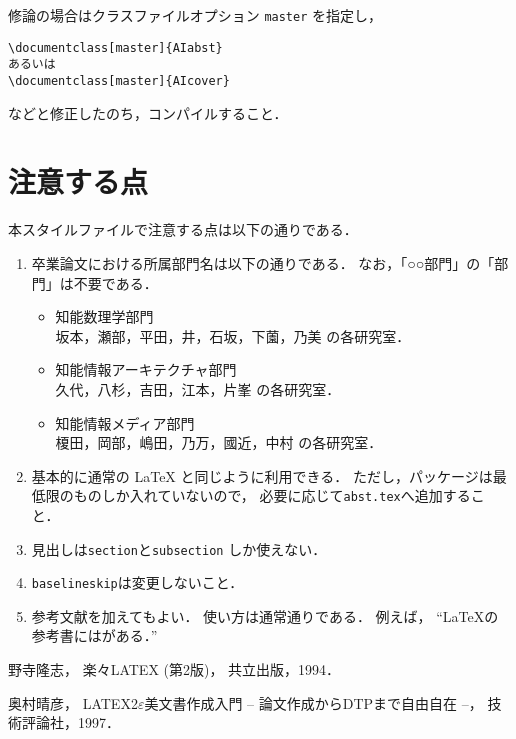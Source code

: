\documentclass[master]{AIabst} %
\begin{document}
修論の場合はクラスファイルオプション {\tt master} を指定し，
\begin{center}
\begin{verbatim}
\documentclass[master]{AIabst}
あるいは
\documentclass[master]{AIcover}
\end{verbatim}
\end{center}
などと修正したのち，コンパイルすること．


\section{注意する点}
本スタイルファイルで注意する点は以下の通りである．
\begin{enumerate}
\item
卒業論文における所属部門名は以下の通りである．
なお，「○○部門」の「部門」は不要である．
\begin{itemize}
\item 知能数理学部門\\
坂本，瀬部，平田，井，石坂，下薗，乃美 
の各研究室．
\item 知能情報アーキテクチャ部門\\
久代，八杉，吉田，江本，片峯 の各研究室．
\item 知能情報メディア部門\\
榎田，岡部，嶋田，乃万，國近，中村
の各研究室．
\end{itemize}

\item
基本的に通常の LaTeX と同じように利用できる．
ただし，パッケージは最低限のものしか入れていないので，
必要に応じて{\tt abst.tex\/}へ追加すること．
\item
見出しは{\tt section\/}と{\tt subsection\/}
しか使えない．
\item
{\tt baselineskip\/}は変更しないこと．
\item
参考文献を加えてもよい．
使い方は通常通りである．
例えば，
``LaTeXの参考書には\cite{rakuraku,bibunsyo}がある．''
\end{enumerate}

{\small
\baselineskip 12pt
\begin{thebibliography}{1}

野寺隆志，
\newblock 
楽々LATEX (第2版)，
\newblock 
共立出版，1994．

奥村晴彦，
\newblock 
LATEX2$\varepsilon$美文書作成入門 -- 論文作成からDTPまで自由自在 --，
\newblock
技術評論社，1997．
\end{thebibliography}
}
\end{document}
